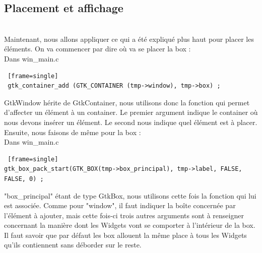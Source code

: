 \documentclass[11pt,french,a4paper]{report}
\begin{document}
    \subsection{Placement et affichage} \\
Maintenant, nous allons appliquer ce qui a été expliqué plus haut pour placer les éléments. On va commencer par dire où 
va se placer la box : \\

\small Dans win\_main.c
\begin{lstlisting} [frame=single]
 gtk_container_add (GTK_CONTAINER (tmp->window), tmp->box) ; 
\end{lstlisting}
GtkWindow hérite de GtkContainer, nous utilisons donc la fonction qui permet d'affecter un élément à un container. Le premier argument 
indique le container où nous devons insérer un élément. Le second nous indique quel élément est à placer. \\

Ensuite, nous faisons de même pour la box : \\
\small Dans win\_main.c
\begin{lstlisting} [frame=single]
gtk_box_pack_start(GTK_BOX(tmp->box_principal), tmp->label, FALSE, FALSE, 0) ; 
\end{lstlisting}
"box\_principal" étant de type GtkBox, nous utilisons cette fois la fonction qui lui est associée. 
Comme pour "window", il faut indiquer la boîte concernée par l'élément à ajouter, mais cette fois-ci trois autres arguments 
sont à renseigner concernant la manière dont les Widgets vont se comporter à l'intérieur de la box. \\ 

Il faut savoir que par défaut les box allouent la même place à tous les Widgets qu'ils contiennent
sans déborder sur le reste.\\
\end{document}
